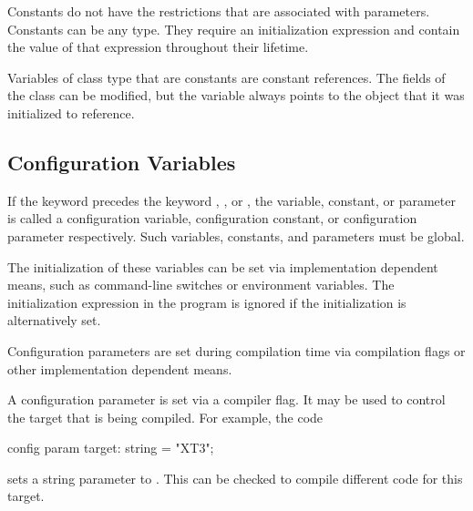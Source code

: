 Constants do not have the restrictions that are associated with
parameters.  Constants can be any type.  They require an initialization
expression and contain the value of that expression throughout their lifetime.

Variables of class type that are constants are constant references.
The fields of the class can be modified, but the variable always
points to the object that it was initialized to reference.

\subsection{Configuration Variables}
\label{Configuration_Variables}

If the keyword  precedes the
keyword , , or , the variable,
constant, or parameter is called a configuration variable,
configuration constant, or configuration parameter respectively.  Such
variables, constants, and parameters must be global.

The initialization of these variables can be set via implementation
dependent means, such as command-line switches or environment
variables.  The initialization expression in the program is ignored if
the initialization is alternatively set.

Configuration parameters are set during compilation time via
compilation flags or other implementation dependent means.
\begin{example}
A configuration parameter is set via a compiler flag.  It may be used
to control the target that is being compiled.  For example, the code
\begin{chapel}
config param target: string = "XT3";
\end{chapel}
sets a string parameter  to .  This can be
checked to compile different code for this target.
\end{example}
